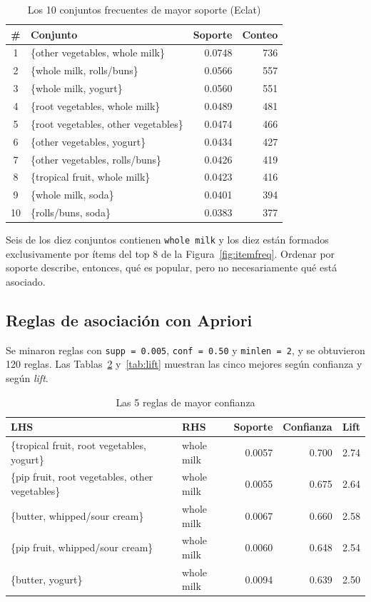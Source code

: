 \documentclass[11pt,a4paper]{article}
\begin{document}
\begin{table}[H]
  \centering
  \caption{Los 10 conjuntos frecuentes de mayor soporte (Eclat)}
  \label{tab:eclat}
  \begin{tabular}{clrr}
    \toprule
    \# & Conjunto & Soporte & Conteo \\
    \midrule
    1 & \{other vegetables, whole milk\} & 0.0748 & 736 \\
    2 & \{whole milk, rolls/buns\} & 0.0566 & 557 \\
    3 & \{whole milk, yogurt\} & 0.0560 & 551 \\
    4 & \{root vegetables, whole milk\} & 0.0489 & 481 \\
    5 & \{root vegetables, other vegetables\} & 0.0474 & 466 \\
    6 & \{other vegetables, yogurt\} & 0.0434 & 427 \\
    7 & \{other vegetables, rolls/buns\} & 0.0426 & 419 \\
    8 & \{tropical fruit, whole milk\} & 0.0423 & 416 \\
    9 & \{whole milk, soda\} & 0.0401 & 394 \\
    10 & \{rolls/buns, soda\} & 0.0383 & 377 \\
    \bottomrule
  \end{tabular}
\end{table}

Seis de los diez conjuntos contienen \texttt{whole milk} y los diez están formados
exclusivamente por ítems del top 8 de la Figura~\ref{fig:itemfreq}. Ordenar por soporte
describe, entonces, qué es popular, pero no necesariamente qué está asociado.

\subsection{Reglas de asociación con Apriori}

Se minaron reglas con \texttt{supp = 0.005}, \texttt{conf = 0.50} y \texttt{minlen = 2}, y se
obtuvieron 120 reglas. Las Tablas~\ref{tab:conf} y~\ref{tab:lift} muestran las cinco mejores
según confianza y según \emph{lift}.

\begin{table}[H]
  \centering
  \caption{Las 5 reglas de mayor confianza}
  \label{tab:conf}
  \small
  \begin{tabular}{llrrr}
    \toprule
    LHS & RHS & Soporte & Confianza & Lift \\
    \midrule
    \{tropical fruit, root vegetables, yogurt\} & whole milk & 0.0057 & 0.700 & 2.74 \\
    \{pip fruit, root vegetables, other vegetables\} & whole milk & 0.0055 & 0.675 & 2.64 \\
    \{butter, whipped/sour cream\} & whole milk & 0.0067 & 0.660 & 2.58 \\
    \{pip fruit, whipped/sour cream\} & whole milk & 0.0060 & 0.648 & 2.54 \\
    \{butter, yogurt\} & whole milk & 0.0094 & 0.639 & 2.50 \\
    \bottomrule
  \end{tabular}
\end{table}
\end{document}
